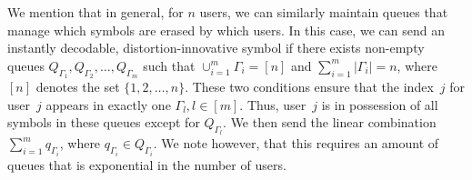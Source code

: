 We mention that in general, for $n$ users, we can similarly maintain queues that manage which symbols are erased by which users.  In this case, we can send an instantly decodable, distortion-innovative symbol if there exists non-empty queues $Q_{\Gamma_1}, Q_{\Gamma_2}, \ldots, Q_{\Gamma_m}$ such that $\cup_{i=1}^{m}\Gamma_i = [n]$ and $\sum_{i=1}^{m}|\Gamma_i| = n$, where $[n]$ denotes the set $\{1, 2, \ldots, n\}$.  These two conditions ensure that the index~$j$ for user~$j$ appears in exactly one $\Gamma_l, l \in [m]$.  Thus, user~$j$ is in possession of all symbols in these queues except for $Q_{\Gamma_l}$.
We then send the linear combination $\sum_{i = 1}^{m} q_{\Gamma_i}$, where $q_{\Gamma_i} \in Q_{\Gamma_i}$. We note however, that this requires an amount of queues that is exponential in the number of users.


